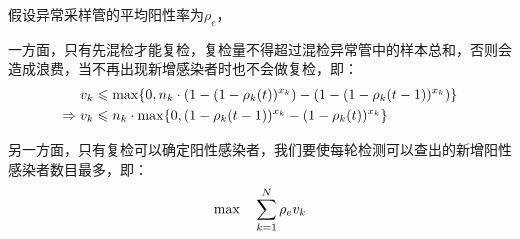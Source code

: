 \documentclass[withoutpreface,bwprint]{cumcmthesis} %
\begin{document}
假设异常采样管的平均阳性率为$\rho_{e}$，

一方面，只有先混检才能复检，复检量不得超过混检异常管中的样本总和，否则会造成浪费，当不再出现新增感染者时也不会做复检，即：
\begin{align}
    v_k &\leqslant {\rm max} \{0, n_k\cdot(1-(1-\rho_k(t))^{x_k})-(1-(1-\rho_k(t-1))^{x_k}) \}\\
    \Rightarrow v_k &\leqslant n_k \cdot {\rm max} \{0, (1-\rho_k(t-1))^{x_k}-(1-\rho_k(t))^{x_k}\}
\end{align}

另一方面，只有复检可以确定阳性感染者，我们要使每轮检测可以查出的新增阳性感染者数目最多，即：
\begin{equation}
    {\rm max} \quad \sum^N_{k=1}\rho_e v_k
\end{equation}
\end{document}
